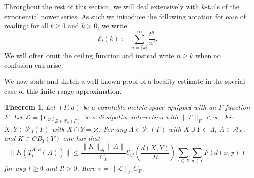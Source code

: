 \documentclass{article}
\newcommand{\E}{\mathscr{E}}
\newcommand{\<}{\langle}
\renewcommand{\>}{\rangle}
\let\emptyset\varnothing
\numberwithin{equation}{section}
\newtheorem{thm}{Theorem}[section]
\theoremstyle{definition}
\begin{document}
Throughout the rest of this section, we will deal extensively with $k$-tails of the exponential power series. As such we introduce the following notation for ease of reading: for all $t\ge 0$ and $k>0$, we write
\begin{equation}
	\E_t(k):= \sum_{n = \lceil k \rceil}^\infty \frac{t^n}{n!}.
\end{equation} We will often omit the ceiling function and instead write $n\ge k$ when no confusion can arise. 


We now state and sketch a well-known proof of a locality estimate
in the special case of this finite-range approximation. 
%
%

\begin{thm}\label{thm:appLRB}
Let $(\Gamma, d)$ be a countable metric space equipped with an $F$-function $F$.
Let $\mathscr{L} = \{L_Z \}_{Z \in \mathcal{P}_0(\Gamma)}$ be a dissipative interaction with $\| \mathscr{L} \|_F< \infty$. 
Fix $X,Y \in \mathcal{P}_0(\Gamma)$ with $X \cap Y = \emptyset$. 
For any $\Lambda \in \mathcal{P}_0( \Gamma)$ with $X \cup Y \subset \Lambda$, $A \in \mathcal{A}_X$, and 
$K\in CB_0(Y)$ one has that 
    \begin{equation}\label{appLRB}
        \|K(T^{\Lambda, R}_t(A))\| \le \frac{\|K\|_{cb}\|A\|}{C_F} \E_{vt}\left(\frac{d(X,Y)}{R}\right) \sum_{x\in X}\sum_{y\in Y} F(d(x,y))
    \end{equation}
    for any $t \geq 0$ and $R>0$.  Here $v = \| \mathscr{L} \|_F C_F$. 
\end{thm}
\end{document}
